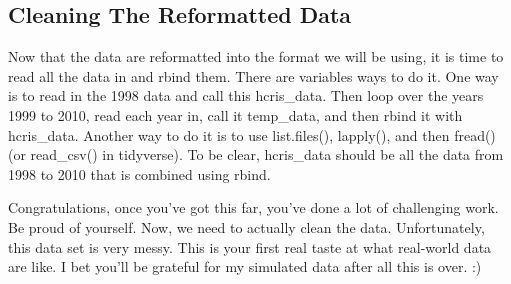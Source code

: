 \documentclass{article}
\begin{document}
	\subsection*{Cleaning The Reformatted Data}
	
	Now that the data are reformatted into the format we will be using, it is time to read all the data in and rbind them. There are variables ways to do it. One way is to read in the 1998 data and call this hcris\_data. Then loop over the years 1999 to 2010, read each year in, call it temp\_data, and then rbind it with hcris\_data. Another way to do it is to use list.files(), lapply(), and then fread() (or read\_csv() in tidyverse). To be clear, hcris\_data should be all the data from 1998 to 2010 that is combined using rbind.
	
	Congratulations, once you've got this far, you've done a lot of challenging work. Be proud of yourself. Now, we need to actually clean the data. Unfortunately, this data set is very messy. This is your first real taste at what real-world data are like. I bet you'll be grateful for my simulated data after all this is over. :)
	
\end{document}
